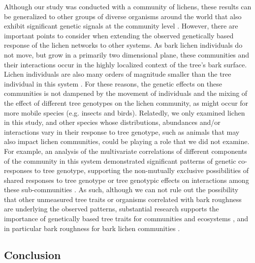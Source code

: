 \documentclass[11pt,twocolumn,twoside,lineno]{pnas-new}
\begin{document}
Although our study was conducted with a community of lichens, these
results can be generalized to other groups of diverse organisms around
the world that also exhibit significant genetic signals at the
community level \cite{Rowntree2011, Whitham2012}. However, there are
important points to consider when extending the observed genetically
based response of the lichen networks to other systems. As bark lichen
individuals do not move, but grow in a primarily two dimensional
plane, these communities and their interactions occur in the highly
localized context of the tree's bark surface. Lichen individuals are
also many orders of magnitude smaller than the tree individual in this
system \cite{Lamit2011}. For these reasons, the genetic effects on
these communities is not dampened by the movement of individuals and
the mixing of the effect of different tree genotypes on the lichen
community, as might occur for more mobile species (e.g. insects and
birds). Relatedly, we only examined lichen in this study, and other
species whose distributions, abundances and/or interactions vary in
their response to tree genotype, such as animals that may also impact
lichen communities, could be playing a role that we did not
examine. For example, an analysis of the multivariate correlations of
different components of the community in this system demonstrated
significant patterns of genetic co-responses to tree genotype,
supporting the non-mutually exclusive possibilities of shared
responses to tree genotype or tree genotypic effects on interactions
among these sub-communities \cite{Lamit2015c}. As such, although we
can not rule out the possibility that other unmeasured tree traits or
organisms correlated with bark roughness are underlying the observed
patterns, substantial research supports the importance of genetically
based tree traits for communities and ecosystems
\cite{DesRoches2018TheVariation}, and in particular bark roughness for
bark lichen communities \cite{Bdeir2017, Lamit2011, Lamit2015a}.




\subsection*{Conclusion}
\end{document}
